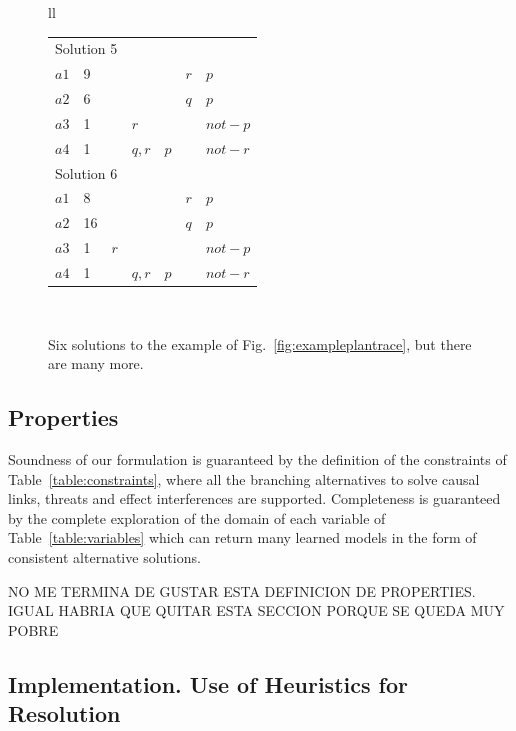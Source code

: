\documentclass[runningheads]{llncs}
\begin{document}
\begin{figure}
\begin{tabular}{ll}
\begin{tabular}{lllllll}
\hline

\multicolumn{7}{l}{Solution 5} \\
$a1$ & 9 & & & & $r$ & $p$ \\
$a2$ & 6 & & & & $q$ & $p$ \\
$a3$ & 1 & & $r$ & & & $not-p$ \\
$a4$ & 1 & & $q,r$ & $p$ & & $not-r$ \\

\hline

\multicolumn{7}{l}{Solution 6} \\
$a1$ & 8 & & & & $r$ & $p$ \\
$a2$ & 16 & & & & $q$ & $p$ \\
$a3$ & 1 & $r$ & & & & $not-p$ \\
$a4$ & 1 & & $q,r$ & $p$ & & $not-r$ \\

\end{tabular} \\

\end{tabular}
\normalsize

\caption{Six solutions to the example of Fig.~\ref{fig:exampleplantrace}, but there are many more.}
\label{figure:solutionsExample}
\end{figure}






\subsection{Properties}

Soundness of our formulation is guaranteed by the definition of the constraints of Table~\ref{table:constraints}, where all the branching alternatives to solve causal links, threats and effect interferences are supported. Completeness is guaranteed by the complete exploration of the domain of each variable of Table~\ref{table:variables} which can return many learned models in the form of consistent alternative solutions.


NO ME TERMINA DE GUSTAR ESTA DEFINICION DE PROPERTIES. IGUAL HABRIA QUE QUITAR ESTA SECCION PORQUE SE QUEDA MUY POBRE








\subsection{Implementation. Use of Heuristics for Resolution}
\label{sec:implementation}
\end{document}
